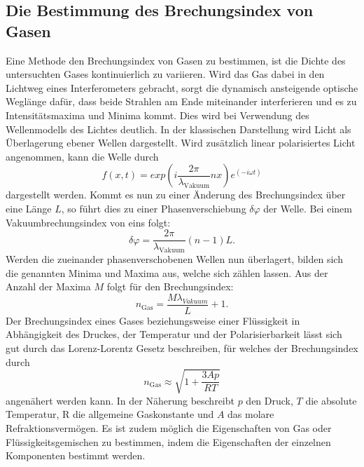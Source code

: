 \subsection{Die Bestimmung des Brechungsindex von Gasen}
 Eine Methode den Brechungsindex von Gasen zu bestimmen, ist die Dichte des untersuchten Gases kontinuierlich zu variieren. Wird das Gas dabei in den Lichtweg eines Interferometers gebracht, sorgt die dynamisch ansteigende optische Weglänge dafür, dass beide Strahlen am Ende miteinander interferieren und es zu Intensitätsmaxima und Minima kommt. Dies wird bei Verwendung des Wellenmodells des Lichtes deutlich. 
 In der klassischen Darstellung wird Licht als Überlagerung ebener Wellen dargestellt. Wird zusätzlich linear polarisiertes Licht angenommen, kann die Welle durch
 \begin{equation}
    f(x,t) = exp(i \frac{2 \pi}{\lambda_\text{Vakuum}} n x ) e^{(-i \omega t)} \label{eq:ebeneWelle}
 \end{equation}
dargestellt werden. Kommt es nun zu einer Änderung des Brechungsindex über eine Länge $L$, so führt dies zu einer Phasenverschiebung $\delta\varphi$ der Welle. Bei einem Vakuumbrechungsindex von eins folgt:
\begin{equation}
    \delta \varphi = \frac{2 \pi}{\lambda_\text{Vakuum}} (n-1) L \text{.} \label{eq:Deltaphi}
\end{equation}
Werden die zueinander phasenverschobenen Wellen nun überlagert, bilden sich die genannten Minima und Maxima aus, welche sich zählen lassen. Aus der Anzahl der Maxima $M$ folgt für den Brechungsindex:
\begin{equation}
	n_\text{Gas} = \frac{M  \lambda_{Vakuum}}{L} +1 \text{.} \label{eq:nGas}
\end{equation} 
Der Brechungsindex eines Gases beziehungsweise einer Flüssigkeit in Abhängigkeit des Druckes, der Temperatur und der Polarisierbarkeit lässt sich gut durch das Lorenz-Lorentz Gesetz beschreiben, für welches der Brechungsindex durch 
\begin{equation}
n_\text{Gas} \approx \sqrt{1+\frac{3 A p}{R T}} \label{eq:lorenz}
\end{equation}
angenähert werden kann. In der Näherung beschreibt $p$ den Druck, $T$ die absolute Temperatur, R die allgemeine Gaskonstante und $A$ das molare Refraktionsvermögen. Es ist zudem möglich die Eigenschaften von Gas oder Flüssigkeitsgemischen zu bestimmen, indem die Eigenschaften der einzelnen Komponenten bestimmt werden.

